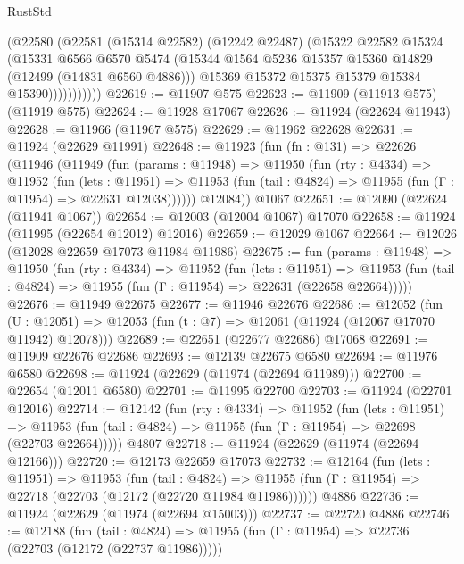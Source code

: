 \begin{lexlean}{RustStd}
\begin{coremodule}
                  (@22580
                    (@22581
                      (@15314 @22582)
                      (@12242 @22487)
                      (@15322
                        @22582
                        @15324
                        (@15331
                          @6566
                          @6570
                          @5474
                          (@15344 @1564 @5236 @15357 @15360 @14829 (@12499 (@14831 @6560 @4886)))
                          @15369
                          @15372
                          @15375
                          @15379
                          @15384
                          @15390)))))))))))
@22619 := @11907 @575
@22623 := @11909 (@11913 @575) (@11919 @575)
@22624 := @11928 @17067
@22626 := @11924 (@22624 @11943)
@22628 := @11966 (@11967 @575)
@22629 := @11962 @22628
@22631 := @11924 (@22629 @11991)
@22648 := @11923
    (fun (fn : @131) =>
    @22626
      (@11946
        (@11949
          (fun (params : @11948) =>
          @11950
            (fun (rty : @4334) =>
            @11952
              (fun (lets : @11951) =>
              @11953 (fun (tail : @4824) => @11955 (fun (Γ : @11954) => @22631 @12038))))))
        @12084))
    @1067
@22651 := @12090 (@22624 (@11941 @1067))
@22654 := @12003 (@12004 @1067) @17070
@22658 := @11924 (@11995 (@22654 @12012) @12016)
@22659 := @12029 @1067
@22664 := @12026 (@12028 @22659 @17073 @11984 @11986)
@22675 := fun (params : @11948) =>
  @11950
    (fun (rty : @4334) =>
    @11952
      (fun (lets : @11951) =>
      @11953 (fun (tail : @4824) => @11955 (fun (Γ : @11954) => @22631 (@22658 @22664)))))
@22676 := @11949 @22675
@22677 := @11946 @22676
@22686 := @12052
    (fun (U : @12051) => @12053 (fun (t : @7) => @12061 (@11924 (@12067 @17070 @11942) @12078)))
@22689 := @22651 (@22677 @22686) @17068
@22691 := @11909 @22676 @22686
@22693 := @12139 @22675 @6580
@22694 := @11976 @6580
@22698 := @11924 (@22629 (@11974 (@22694 @11989)))
@22700 := @22654 (@12011 @6580)
@22701 := @11995 @22700
@22703 := @11924 (@22701 @12016)
@22714 := @12142
    (fun (rty : @4334) =>
    @11952
      (fun (lets : @11951) =>
      @11953 (fun (tail : @4824) => @11955 (fun (Γ : @11954) => @22698 (@22703 @22664)))))
    @4807
@22718 := @11924 (@22629 (@11974 (@22694 @12166)))
@22720 := @12173 @22659 @17073
@22732 := @12164
    (fun (lets : @11951) =>
    @11953
      (fun (tail : @4824) =>
      @11955 (fun (Γ : @11954) => @22718 (@22703 (@12172 (@22720 @11984 @11986))))))
    @4886
@22736 := @11924 (@22629 (@11974 (@22694 @15003)))
@22737 := @22720 @4886
@22746 := @12188
    (fun (tail : @4824) => @11955 (fun (Γ : @11954) => @22736 (@22703 (@12172 (@22737 @11986)))))

\end{coremodule}
\end{lexlean}
